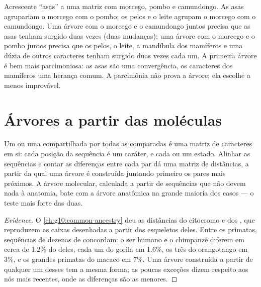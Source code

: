 \begin{example}\label{ex:g12:phylogenetic-trees:parsimony}
Acrescente ``asas'' a uma matriz com morcego, pombo e camundongo. As
asas agrupariam o morcego com o pombo; os pelos e o leite agrupam o
morcego com o camundongo. Uma árvore com o morcego e o camundongo
juntos precisa que as asas tenham surgido duas vezes (duas mudanças);
uma árvore com o morcego e o pombo juntos precisa que os pelos, o
leite, a mandíbula dos mamíferos e uma dúzia de outros caracteres
tenham surgido duas vezes cada um. A primeira árvore é bem mais
parcimoniosa: as asas são uma convergência, os caracteres dos mamíferos
uma herança comum. A parcimônia não prova a árvore; ela escolhe a menos
improvável.
\end{example}

\section{Árvores a partir das moléculas}

\begin{proposition}\label{prop:g12:phylogenetic-trees:molecular}
Um  ou uma  compartilhada por todas as  comparadas
é uma matriz de caracteres em si: cada posição da sequência é um
caráter, e cada  ou  um estado. Alinhar as
sequências e contar as diferenças entre cada par dá uma matriz de
distâncias, a partir da qual uma árvore é construída juntando primeiro
os pares mais próximos. A árvore molecular, calculada a partir de
sequências que não devem nada à anatomia, bate com a árvore anatômica
na grande maioria dos casos --- o teste mais forte das duas.
\end{proposition}
\begin{proof}[Evidence]
O \cref{ch:g10:common-ancestry} deu as distâncias do citocromo c dos
, que reproduzem as caixas desenhadas a partir dos
esqueletos deles. Entre os primatas, sequências de dezenas de 
concordam: o ser humano e o chimpanzé diferem em cerca de 1.2\% do 
deles, cada um do gorila em 1.6\%, os três do orangotango em 3\%, e os
grandes primatas do macaco em 7\%. Uma árvore construída a partir de
qualquer um desses  tem a mesma forma; as poucas exceções dizem
respeito aos nós mais recentes, onde as diferenças são as menores.
\end{proof}

